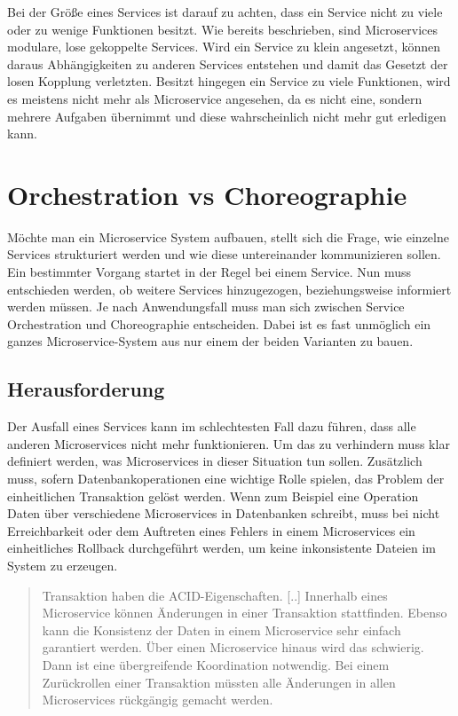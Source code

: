 Bei der Größe eines Services ist darauf zu achten, dass ein Service nicht zu viele oder zu wenige Funktionen besitzt. Wie bereits beschrieben, sind Microservices modulare, lose gekoppelte Services. Wird ein Service zu klein angesetzt, können daraus Abhängigkeiten zu anderen Services entstehen und damit das Gesetzt der losen Kopplung verletzten. Besitzt hingegen ein Service zu viele Funktionen, wird es meistens nicht mehr als Microservice angesehen, da es nicht eine, sondern mehrere Aufgaben übernimmt und diese wahrscheinlich nicht mehr gut erledigen kann.

\section{Orchestration vs Choreographie}
\label{sec:orchestrationvschoreographie}
Möchte man ein Microservice System aufbauen, stellt sich die Frage, wie einzelne Services strukturiert werden und wie diese untereinander kommunizieren sollen. Ein bestimmter Vorgang startet in der Regel bei einem Service. Nun muss entschieden werden, ob weitere Services hinzugezogen, beziehungsweise informiert werden müssen.
Je nach Anwendungsfall muss man sich zwischen Service Orchestration und Choreographie entscheiden. Dabei ist es fast unmöglich ein ganzes Microservice-System aus nur einem der beiden Varianten zu bauen.

\subsection{Herausforderung}
\label{sec:Herausforderung}
Der Ausfall eines Services kann im schlechtesten Fall dazu führen, dass alle anderen Microservices nicht mehr funktionieren. Um das zu verhindern muss klar definiert werden, was Microservices in dieser Situation tun sollen. Zusätzlich muss, sofern Datenbankoperationen eine wichtige Rolle spielen, das Problem der einheitlichen Transaktion gelöst werden. Wenn zum Beispiel eine Operation Daten über verschiedene Microservices in Datenbanken schreibt, muss bei nicht Erreichbarkeit oder dem Auftreten eines Fehlers in einem Microservices ein einheitliches Rollback durchgeführt werden, um keine inkonsistente Dateien im System zu erzeugen.

\begin{quotation}
    \frqq Transaktion haben die ACID-Eigenschaften. [..] Innerhalb eines Microservice können Änderungen in einer Transaktion stattfinden. Ebenso kann die Konsistenz der Daten in einem Microservice sehr einfach garantiert werden. Über einen Microservice hinaus wird das schwierig. Dann ist eine übergreifende Koordination notwendig. Bei einem Zurückrollen einer Transaktion müssten alle Änderungen in allen Microservices rückgängig gemacht werden.\flqq\ \cite[S. 35]{EWolff2016:Microservices}
\end{quotation}

